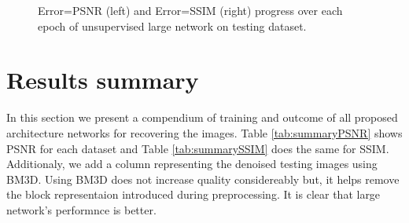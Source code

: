\vspace{1cm}

\begin{figure}[!htb] 
\centering 
{} 
\caption[PSNR and SSIM testing progress during training of unsupervised large network]{\color{red}Error=PSNR \color{black}(left) and \color{red}Error=SSIM \color{black}(right) progress over each epoch of unsupervised large network on testing dataset.}
\label{fig:betaUnsupTestPSNRSSIM} 
\end{figure}

\FloatBarrier

\newpage

\section{Results summary}

In this section we present a compendium of training and outcome of all proposed architecture networks for recovering the images. Table \ref{tab:summaryPSNR} shows PSNR for each dataset and Table \ref{tab:summarySSIM} does the same for SSIM. Additionaly, we add a column representing the denoised testing images using BM3D\cite{dabov2007image}. Using BM3D does not increase quality considereably but, it helps remove the block representaion introduced during preprocessing. It is clear that large network's performnce is better. 

\vspace{1cm}

\begin{table}[!htb]
\caption[Summary of PSNR for reconstructing networks]{Comparison of PSNR performance for each proposed network.}
\label{tab:summaryPSNR}
\begin{center}
\end{center}
\end{table}

